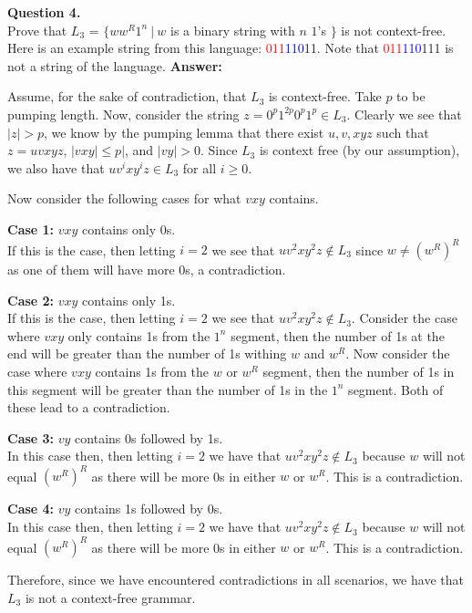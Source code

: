 \documentclass{article}
\newenvironment{question}[2]
{
    {\large \textbf{Question #1.}}\\
    #2 \newline\newline
    \textbf{Answer:}
}{}{\newpage}
\begin{document}
\begin{question}
    {4}
    {Prove that $L_3$ = $\{ww^R1^n ~|~ w$ is a binary string with $n$ $1$'s $\}$ is not context-free.\\
        Here is an example string from this language: \textcolor{red}{011}\textcolor{blue}{110}11.  Note that \textcolor{red}{011}\textcolor{blue}{110}111
        is not a string of the language.}

    Assume, for the sake of contradiction, that $L_3$ is context-free. Take $p$ to be pumping length. Now, consider the string
    $z = 0^p1^{2p}0^p1^p \in L_3$. Clearly we see that $|z| > p$, we know by the pumping lemma that there exist $u, v, x y z$ such that
    $z = uvxyz$, $|vxy| \leq p|$, and $|vy| > 0$. Since $L_3$ is context free (by our assumption), we also have that $uv^ixy^iz \in L_3$ for all
    $i \geq 0$.

    Now consider the following cases for what $vxy$ contains.

    \textbf{Case 1:} $vxy$ contains only 0s.\\
    If this is the case, then letting $i = 2$ we see that $uv^2xy^2z \not \in L_3$ since $w \neq (w^R)^R$ as one of them will have more 0s, a contradiction.

    \textbf{Case 2:} $vxy$ contains only 1s.\\
    If this is the case, then letting $i = 2$ we see that $uv^2xy^2z \not \in L_3$. Consider the case where $vxy$ only contains 1s from the $1^n$ segment,
    then the number of 1s at the end will be greater than the number of 1s withing $w$ and $w^R$. Now consider the case where $vxy$ contains 1s from the
    $w$ or $w^R$ segment, then the number of 1s in this segment will be greater than the number of 1s in the $1^n$ segment. Both of these lead to a
    contradiction.

    \textbf{Case 3:} $vy$ contains 0s followed by 1s.\\
    In this case then, then letting $i = 2$ we have that $uv^2xy^2z \not \in L_3$ because $w$ will not equal $(w^R)^R$ as there will be more 0s in either
    $w$ or $w^R$. This is a contradiction.

    \textbf{Case 4:} $vy$ contains 1s followed by 0s.\\
    In this case then, then letting $i = 2$ we have that $uv^2xy^2z \not \in L_3$ because $w$ will not equal $(w^R)^R$ as there will be more 0s in either
    $w$ or $w^R$. This is a contradiction.

    Therefore, since we have encountered contradictions in all scenarios, we have that $L_3$ is not a context-free grammar.
\end{question}
\end{document}
